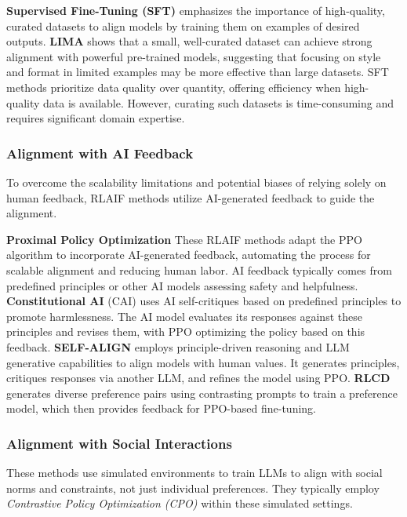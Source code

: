 \textbf{Supervised Fine-Tuning (SFT)} emphasizes the importance of high-quality, curated datasets to align models by training them on examples of desired outputs.
\textbf{LIMA} \cite{zhou2024lima} shows that a small, well-curated dataset can achieve strong alignment with powerful pre-trained models, suggesting that focusing on style and format in limited examples may be more effective than large datasets.
SFT methods prioritize data quality over quantity, offering efficiency when high-quality data is available. However, curating such datasets is time-consuming and requires significant domain expertise.

\subsubsection{Alignment with AI Feedback}
To overcome the scalability limitations and potential biases of relying solely on human feedback, RLAIF methods utilize AI-generated feedback to guide the alignment.

\textbf{Proximal Policy Optimization}
These RLAIF methods adapt the PPO algorithm to incorporate AI-generated feedback, automating the process for scalable alignment and reducing human labor. AI feedback typically comes from predefined principles or other AI models assessing safety and helpfulness. \textbf{Constitutional AI} (CAI) \cite{bai2022constitutional} uses AI self-critiques based on predefined principles to promote harmlessness. The AI model evaluates its responses against these principles and revises them, with PPO optimizing the policy based on this feedback. \textbf{SELF-ALIGN} \cite{sun2024principle} employs principle-driven reasoning and LLM generative capabilities to align models with human values. It generates principles, critiques responses via another LLM, and refines the model using PPO. \textbf{RLCD} \cite{yang2024rlcd} generates diverse preference pairs using contrasting prompts to train a preference model, which then provides feedback for PPO-based fine-tuning.

\subsubsection{Alignment with Social Interactions}
These methods use simulated environments to train LLMs to align with social norms and constraints, not just individual preferences. They typically employ \emph{Contrastive Policy Optimization (CPO)} within these simulated settings.

